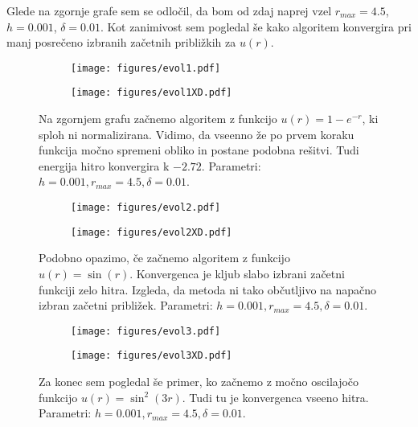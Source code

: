 \documentclass{article}
\begin{document}
Glede na zgornje grafe sem se odločil, da bom od zdaj naprej vzel $r_{max}=4.5$, $h=0.001$, $\delta = 0.01$. 
Kot zanimivost sem pogledal še kako algoritem konvergira pri manj posrečeno izbranih začetnih približkih za $u(r)$.

\begin{figure}[H]
\centering
\begin{subfigure}{.49\textwidth}
\texttt{[image: figures/evol1.pdf]}
\end{subfigure}
\begin{subfigure}{.49\textwidth}
\texttt{[image: figures/evol1XD.pdf]}
\end{subfigure}
\caption*{Na zgornjem grafu začnemo algoritem z funkcijo $u(r) = 1 - e^{-r}$, ki sploh ni normalizirana. Vidimo, da vseenno že po prvem koraku  funkcija močno spremeni obliko in postane podobna rešitvi. Tudi energija hitro konvergira k $-2.72$. Parametri: $h=0.001, r_{max}=4.5, \delta=0.01$.}
\end{figure}

\begin{figure}[H]
\centering
\begin{subfigure}{.49\textwidth}
\texttt{[image: figures/evol2.pdf]}
\end{subfigure}
\begin{subfigure}{.49\textwidth}
\texttt{[image: figures/evol2XD.pdf]}
\end{subfigure}
\caption*{Podobno opazimo, če začnemo algoritem z funkcijo $u(r) = \sin(r)$. Konvergenca je kljub slabo izbrani začetni funkciji zelo hitra. Izgleda, da metoda ni tako občutljivo na napačno izbran začetni približek. Parametri: $h=0.001, r_{max}=4.5, \delta=0.01$.}
\end{figure}

\begin{figure}[H]
\centering
\begin{subfigure}{.49\textwidth}
\texttt{[image: figures/evol3.pdf]}
\end{subfigure}
\begin{subfigure}{.49\textwidth}
\texttt{[image: figures/evol3XD.pdf]}
\end{subfigure}
\caption*{Za konec sem pogledal še primer, ko začnemo z močno oscilajočo funkcijo $u(r) = \sin^2 (3r)$. Tudi tu je konvergenca vseeno hitra. Parametri: $h=0.001, r_{max}=4.5, \delta=0.01$.}
\end{figure}
\end{document}
